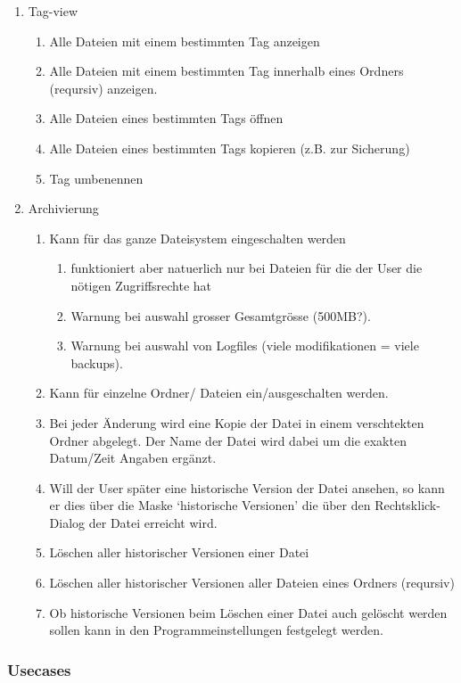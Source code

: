 \documentclass[10pt,paper=a4,final]{scrartcl}
\begin{document}
\begin{enumerate}
	\item Tag-view
	\begin{enumerate}
		\item Alle Dateien mit einem bestimmten Tag anzeigen
		\item Alle Dateien mit einem bestimmten Tag innerhalb eines Ordners (reqursiv) anzeigen.
		\item Alle Dateien eines bestimmten Tags \"offnen
		\item Alle Dateien eines bestimmten Tags kopieren (z.B. zur Sicherung)
		\item Tag umbenennen
	\end{enumerate}
	\item Archivierung
	\begin{enumerate}
		\item Kann f\"ur das ganze Dateisystem eingeschalten werden
		\begin{enumerate}
			\item funktioniert aber natuerlich nur bei Dateien f\"ur die der User die n\"otigen Zugriffsrechte hat
			\item Warnung bei auswahl grosser Gesamtgrösse (500MB?).
			\item Warnung bei auswahl von Logfiles (viele modifikationen = viele backups).
		\end{enumerate}
		\item Kann f\"ur einzelne Ordner/ Dateien ein/ausgeschalten werden.
		\item Bei jeder \"Anderung wird eine Kopie der Datei in einem verschtekten Ordner abgelegt. Der Name der Datei wird dabei um die exakten Datum/Zeit Angaben erg\"anzt.
		\item Will der User sp\"ater eine historische Version der Datei ansehen, so kann er dies \"uber die Maske ‘historische Versionen’ die \"uber den Rechtsklick-Dialog der Datei erreicht wird.
		\item L\"oschen aller historischer Versionen einer Datei
		\item L\"oschen aller historischer Versionen aller Dateien eines Ordners (reqursiv)
		\item Ob historische Versionen beim L\"oschen einer Datei auch gel\"oscht werden sollen kann in den Programmeinstellungen festgelegt werden.
	\end{enumerate}
\end{enumerate}
\newpage
\subsubsection{Usecases}
\end{document}
